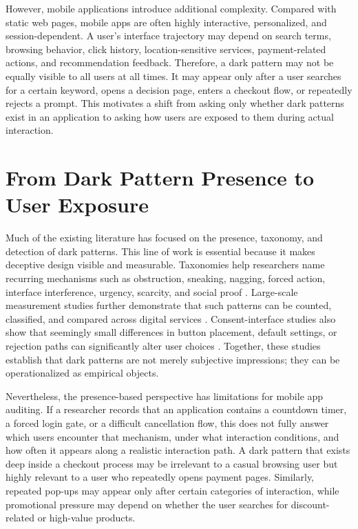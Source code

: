 However, mobile applications introduce additional complexity. Compared with static web pages, mobile apps are often highly interactive, personalized, and session-dependent. A user’s interface trajectory may depend on search terms, browsing behavior, click history, location-sensitive services, payment-related actions, and recommendation feedback. Therefore, a dark pattern may not be equally visible to all users at all times. It may appear only after a user searches for a certain keyword, opens a decision page, enters a checkout flow, or repeatedly rejects a prompt. This motivates a shift from asking only whether dark patterns exist in an application to asking how users are exposed to them during actual interaction.

\section{From Dark Pattern Presence to User Exposure}

Much of the existing literature has focused on the presence, taxonomy, and detection of dark patterns. This line of work is essential because it makes deceptive design visible and measurable. Taxonomies help researchers name recurring mechanisms such as obstruction, sneaking, nagging, forced action, interface interference, urgency, scarcity, and social proof \cite{gray2018darkpatterns,mathur2019darkpatterns}. Large-scale measurement studies further demonstrate that such patterns can be counted, classified, and compared across digital services \cite{mathur2019darkpatterns}. Consent-interface studies also show that seemingly small differences in button placement, default settings, or rejection paths can significantly alter user choices \cite{nouwens2020gdpr}. Together, these studies establish that dark patterns are not merely subjective impressions; they can be operationalized as empirical objects.

Nevertheless, the presence-based perspective has limitations for mobile app auditing. If a researcher records that an application contains a countdown timer, a forced login gate, or a difficult cancellation flow, this does not fully answer which users encounter that mechanism, under what interaction conditions, and how often it appears along a realistic interaction path. A dark pattern that exists deep inside a checkout process may be irrelevant to a casual browsing user but highly relevant to a user who repeatedly opens payment pages. Similarly, repeated pop-ups may appear only after certain categories of interaction, while promotional pressure may depend on whether the user searches for discount-related or high-value products.

